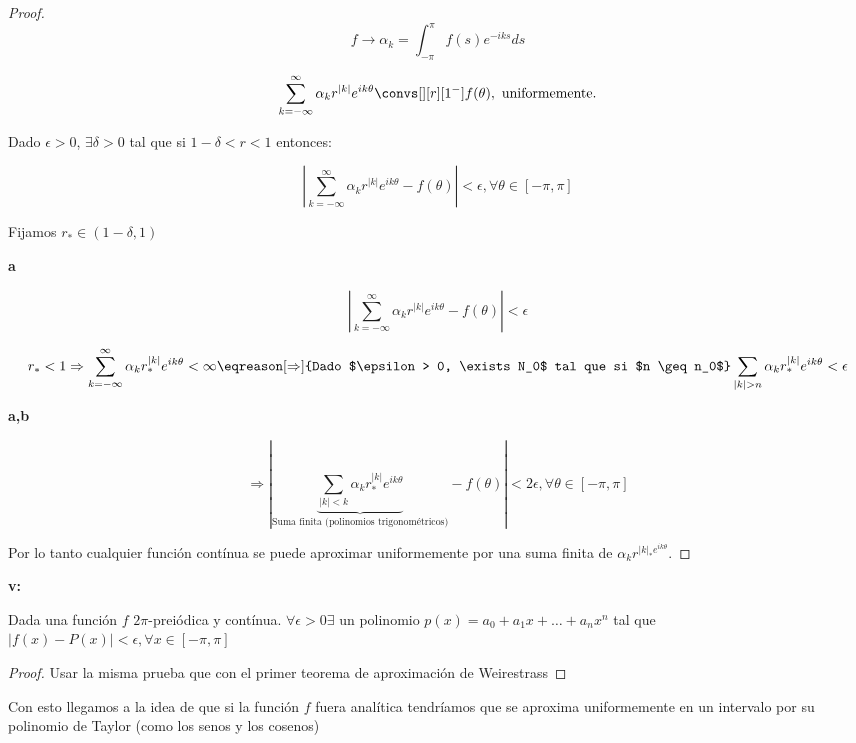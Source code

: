 		\begin{proof}

			\[f \rightarrow \alpha_k = \int_{-\pi}^\pi f(s) e^{-iks} ds  \]

			\[ \sum_{k=-\infty}^{\infty} \alpha_k r^{|k|} e^{ik\theta} \convs[][r][1^-] f(\theta), \text{ uniformemente.} \]

			Dado $\epsilon > 0$, $\exists \delta > 0$ tal que si $1-\delta < r < 1$ entonces:

			\[ \left| \sum_{k=-\infty}^{\infty} \alpha_k r^{|k|} e^{ik\theta} - f(\theta) \right| < \epsilon, \forall \theta \in [-\pi,\pi]  \]

			Fijamos $r_{*} \in (1-\delta, 1)$

			\textbf{a}

			\[ \left| \sum_{k=-\infty}^{\infty} \alpha_k r^{|k|} e^{ik\theta} - f(\theta) \right| < \epsilon \]

			\[  r_* < 1 \Rightarrow \sum_{k=-\infty}^\infty \alpha_k r_*^{|k|} e^{ik\theta} < \infty \eqreason[\Rightarrow]{Dado $\epsilon > 0, \exists N_0$ tal que si $n \geq n_0$} \sum_{|k| > n} \alpha_k r_*^{|k|} e^{ik\theta} < \epsilon \]

			\textbf{a,b}

			\[ \Rightarrow  \left| \underbrace{\sum_{|k| < k} \alpha_k r_*^{|k|} e^{ik\theta}}_{\text{Suma finita (polinomios trigonométricos)}} - f(\theta) \right| < 2 \epsilon, \forall \theta \in [-\pi,\pi] \]

			Por lo tanto cualquier función contínua se puede aproximar uniformemente por una suma finita de $\alpha_k r^{|k|_* e^{ik\theta}}$.

		\end{proof}

		\textbf{v:} 

		Dada una función $f$ $2\pi$-preiódica y contínua. $\forall \epsilon > 0 \exists$ un polinomio $p(x)= a_0 + a_1 x + … + a_n x^n $ tal que $|f(x)-P(x)| < \epsilon, \forall x \in [-\pi,\pi]$

		\begin{proof}

			Usar la misma prueba que con el primer teorema de aproximación de Weirestrass

		\end{proof}

		Con esto llegamos a la idea de que si la función $f$ fuera analítica tendríamos que se aproxima uniformemente en un intervalo por su polinomio de Taylor (como los senos y los cosenos)

